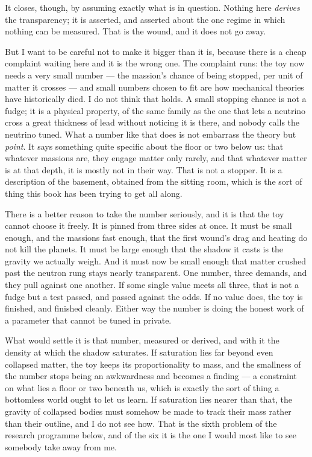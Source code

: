 \documentclass[fontsize=11pt,paper=a4,pagesize=auto,parskip=half-]{scrbook}
\begin{document}
It closes, though, by assuming exactly what is in question. Nothing here \emph{derives} the transparency; it is asserted, and asserted about the one regime in which nothing can be measured. That is the wound, and it does not go away.

But I want to be careful not to make it bigger than it is, because there is a cheap complaint waiting here and it is the wrong one. The complaint runs: the toy now needs a very small number --- the massion's chance of being stopped, per unit of matter it crosses --- and small numbers chosen to fit are how mechanical theories have historically died. I do not think that holds. A small stopping chance is not a fudge; it is a physical property, of the same family as the one that lets a neutrino cross a great thickness of lead without noticing it is there, and nobody calls the neutrino tuned. What a number like that does is not embarrass the theory but \emph{point}. It says something quite specific about the floor or two below us: that whatever massions are, they engage matter only rarely, and that whatever matter is at that depth, it is mostly not in their way. That is not a stopper. It is a description of the basement, obtained from the sitting room, which is the sort of thing this book has been trying to get all along.

There is a better reason to take the number seriously, and it is that the toy cannot choose it freely. It is pinned from three sides at once. It must be small enough, and the massions fast enough, that the first wound's drag and heating do not kill the planets. It must be large enough that the shadow it casts is the gravity we actually weigh. And it must now be small enough that matter crushed past the neutron rung stays nearly transparent. One number, three demands, and they pull against one another. If some single value meets all three, that is not a fudge but a test passed, and passed against the odds. If no value does, the toy is finished, and finished cleanly. Either way the number is doing the honest work of a parameter that cannot be tuned in private.

What would settle it is that number, measured or derived, and with it the density at which the shadow saturates. If saturation lies far beyond even collapsed matter, the toy keeps its proportionality to mass, and the smallness of the number stops being an awkwardness and becomes a finding --- a constraint on what lies a floor or two beneath us, which is exactly the sort of thing a bottomless world ought to let us learn. If saturation lies nearer than that, the gravity of collapsed bodies must somehow be made to track their mass rather than their outline, and I do not see how. That is the sixth problem of the research programme below, and of the six it is the one I would most like to see somebody take away from me.
\end{document}
